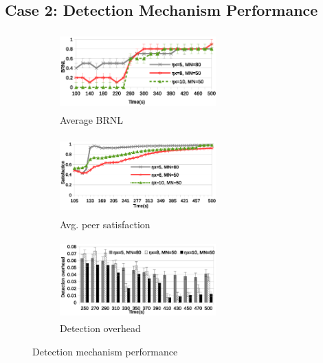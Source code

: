 % 
% 
% 
% 
% 

\subsection{Case 2: Detection Mechanism Performance}


\begin{figure}[tb]
  \centering
  \begin{subfigure}[t]{0.32\textwidth}
    \centering
    \includegraphics[width=6cm,height=3cm]{./Figures/det-BRNL1.eps}
    \caption{Average BRNL}%
    \label{subfig:BRNL}
  \end{subfigure}
  \begin{subfigure}[t]{0.32\textwidth}
    \centering
    \includegraphics[width=6cm,height=3cm]{./Figures/det-sat.eps}
    \caption{Avg. peer satisfaction}%
    \label{subfig:det-sat}
  \end{subfigure}
  \begin{subfigure}[t]{0.32\textwidth}
    \centering
    \includegraphics[width=6cm,height=3cm]{./Figures/overhead.eps}
    \caption{Detection overhead}%
    \label{subfig:overhead}
  \end{subfigure}
  \caption{Detection mechanism performance}%
  \label{fig:detection-results}
   \vspace{-4.5mm}
\end{figure}


